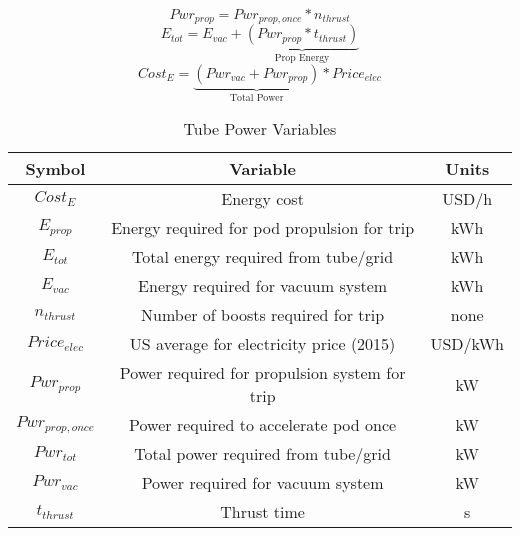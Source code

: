 \begin{equation}
	Pwr_{prop} = Pwr_{prop,once} * n_{thrust}
\end{equation}
\begin{equation}
	E_{tot} = E_{vac} + \underbrace{(Pwr_{prop} * t_{thrust})}_\text{Prop Energy}
\end{equation}
\begin{equation}
	Cost_{E} = \underbrace{(Pwr_{vac} + Pwr_{prop})}_\text{Total Power} * Price_{elec}
\end{equation}
\begin{table}[ht]
	\caption{Tube Power Variables} %
	\centering %
	\begin{tabular}{c c c} %
		\hline\hline %
		Symbol             & Variable                                      & Units   \\ [0.5ex] %
		\hline %
		$Cost_{E}$         & Energy cost                                   & USD/h   \\
		$E_{prop}$         & Energy required for pod propulsion for trip   & kWh     \\
		$E_{tot}$          & Total energy required from tube/grid          & kWh     \\
		$E_{vac}$          & Energy required for vacuum system             & kWh     \\
		$n_{thrust}$       & Number of boosts required for trip            & none    \\
		$Price_{elec}$     & US average for electricity price (2015)       & USD/kWh \\
		$Pwr_{prop}$       & Power required for propulsion system for trip & kW      \\
		$ Pwr_{prop,once}$ & Power required to accelerate pod once         & kW      \\
		$Pwr_{tot}$        & Total power required from tube/grid           & kW      \\
		$Pwr_{vac}$        & Power required for vacuum system              & kW      \\
		$t_{thrust}$       & Thrust time                                   & s       \\
		\hline %
	\end{tabular}
	\label{tbl:tube_power_vars} %
\end{table}
